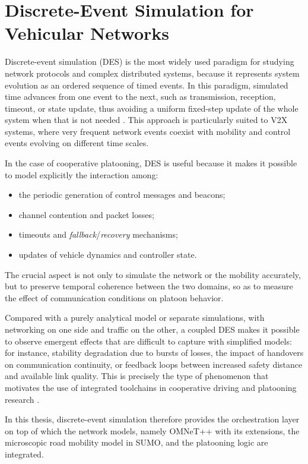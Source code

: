 \section{Discrete-Event Simulation for Vehicular Networks}
\label{env:discrete_event}

Discrete-event simulation (DES) is the most widely used paradigm for studying network protocols and complex distributed systems, because it represents system evolution as an ordered sequence of timed events. In this paradigm, simulated time advances from one event to the next, such as transmission, reception, timeout, or state update, thus avoiding a uniform fixed-step update of the whole system when that is not needed \cite{varga2008overview}. This approach is particularly suited to V2X systems, where very frequent network events coexist with mobility and control events evolving on different time scales.

In the case of cooperative platooning, DES is useful because it makes it possible to model explicitly the interaction among:
\begin{itemize}
\item the periodic generation of control messages and beacons;
\item channel contention and packet losses;
\item timeouts and \emph{fallback}/\emph{recovery} mechanisms;
\item updates of vehicle dynamics and controller state.
\end{itemize}
The crucial aspect is not only to simulate the network or the mobility accurately, but to preserve temporal coherence between the two domains, so as to measure the effect of communication conditions on platoon behavior.

Compared with a purely analytical model or separate simulations, with networking on one side and traffic on the other, a coupled DES makes it possible to observe emergent effects that are difficult to capture with simplified models: for instance, stability degradation due to bursts of losses, the impact of handovers on communication continuity, or feedback loops between increased safety distance and available link quality. This is precisely the type of phenomenon that motivates the use of integrated toolchains in cooperative driving and platooning research \cite{sommer2011bidirectionally,segata2014plexe,segata2023multi-technology}.

In this thesis, discrete-event simulation therefore provides the orchestration layer on top of which the network models, namely OMNeT++ with its extensions, the microscopic road mobility model in SUMO, and the platooning logic are integrated.
